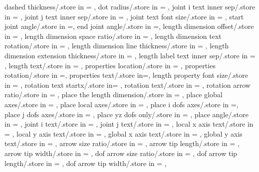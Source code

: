 {dashed thickness/.store in = \dashedthk,
dot radius/.store in = \dotradius,
joint i text inner sep/.store in = \jointinnersepi,
joint j text inner sep/.store in = \jointinnersepj,
joint text font size/.store in = \jointtextfontsize,
start joint angle/.store in =\startjointangle,
end joint angle/.store in =\endjointangle,
length dimension offset/.store in = \lengthdimoffset,
length dimension space ratio/.store in = \lengthdimspaceratio,
length dimension text rotation/.store in = \lengthlabelrotation,
length dimension line thickness/.store in = \lengthdimlinethick,
length dimension extension thickness/.store in = \lengthdimextthick,
length label text inner sep/.store in = \lengthlabeltextinnersep,
length text/.store in = \lengthtext,
properties location/.store in = \propertyloc,
properties rotation/.store in =\propertyrotation,
properties text/.store in=\propertiestext,
length property font size/.store in = \lengthpropfontsize,
rotation text startx/.store in= \rotationanglex,
rotation text/.store in = \rotationtext,
rotation arrow ratio/.store in = \rotationarrowratio,
place the length dimension/.store in = \placelengthdim,
place global axes/.store in = \placeglobalaxes,
place local axes/.store in = \placelocalaxes,
place i dofs axes/.store in =\placeidofs,
place j dofs axes/.store in = \placejdofs,
place yz dofs only/.store in = \placeyzdofsonly,
place angle/.store in = \placeangle,
joint i text/.store in = \jointitext,
joint j text/.store in = \jointjtext,
local x axis text/.store in = \localxtext,
local y axis text/.store in = \localytext,
global x axis text/.store in = \globalxtext,
global y axis text/.store in = \globalytext,
arrow size ratio/.store in = \arrsizrat,
arrow tip length/.store in = \arrlen,
arrow tip width/.store in = \arrwid,
dof arrow size ratio/.store in = \dofarrtipsizrat,
dof arrow tip length/.store in = \dofarrtiplen,
dof arrow tip width/.store in = \dofarrtipwid,}

